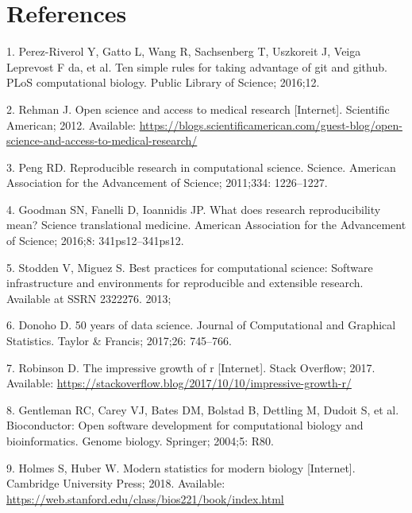 \documentclass[10pt,letterpaper]{article}
\begin{document}
\hypertarget{references}{%
\section*{References}\label{references}}

\hypertarget{refs}{}
\leavevmode\hypertarget{ref-perez2016}{}%
1. Perez-Riverol Y, Gatto L, Wang R, Sachsenberg T, Uszkoreit J, Veiga
Leprevost F da, et al. Ten simple rules for taking advantage of git and
github. PLoS computational biology. Public Library of Science; 2016;12.

\leavevmode\hypertarget{ref-rehman2012}{}%
2. Rehman J. Open science and access to medical research {[}Internet{]}.
Scientific American; 2012. Available:
\url{https://blogs.scientificamerican.com/guest-blog/open-science-and-access-to-medical-research/}

\leavevmode\hypertarget{ref-peng2011}{}%
3. Peng RD. Reproducible research in computational science. Science.
American Association for the Advancement of Science; 2011;334:
1226--1227.

\leavevmode\hypertarget{ref-goodman2016}{}%
4. Goodman SN, Fanelli D, Ioannidis JP. What does research
reproducibility mean? Science translational medicine. American
Association for the Advancement of Science; 2016;8: 341ps12--341ps12.

\leavevmode\hypertarget{ref-stodden2013}{}%
5. Stodden V, Miguez S. Best practices for computational science:
Software infrastructure and environments for reproducible and extensible
research. Available at SSRN 2322276. 2013;

\leavevmode\hypertarget{ref-donoho2017}{}%
6. Donoho D. 50 years of data science. Journal of Computational and
Graphical Statistics. Taylor \& Francis; 2017;26: 745--766.

\leavevmode\hypertarget{ref-robinson2017}{}%
7. Robinson D. The impressive growth of r {[}Internet{]}. Stack
Overflow; 2017. Available:
\url{https://stackoverflow.blog/2017/10/10/impressive-growth-r/}

\leavevmode\hypertarget{ref-gentleman2004}{}%
8. Gentleman RC, Carey VJ, Bates DM, Bolstad B, Dettling M, Dudoit S, et
al. Bioconductor: Open software development for computational biology
and bioinformatics. Genome biology. Springer; 2004;5: R80.

\leavevmode\hypertarget{ref-holmes2018}{}%
9. Holmes S, Huber W. Modern statistics for modern biology
{[}Internet{]}. Cambridge University Press; 2018. Available:
\url{https://web.stanford.edu/class/bios221/book/index.html}
\end{document}
